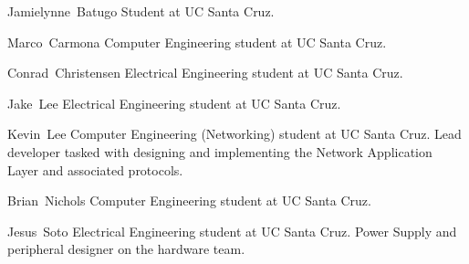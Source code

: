 \documentclass[journal,compsoc]{IEEEtran}
\begin{document}
\begin{IEEEbiography}{Jamielynne~Batugo}
  Student at UC Santa Cruz.
\end{IEEEbiography}

\begin{IEEEbiography}{Marco~Carmona}
  Computer Engineering student at UC Santa Cruz.
\end{IEEEbiography}

\begin{IEEEbiography}
{Conrad~Christensen}
  Electrical Engineering student at UC Santa Cruz.
\end{IEEEbiography}

\begin{IEEEbiography}{Jake~Lee}
  Electrical Engineering student at UC Santa Cruz.
\end{IEEEbiography}

\begin{IEEEbiography}
{Kevin~Lee}
  Computer Engineering (Networking) student at UC Santa Cruz. Lead developer tasked with designing and implementing the Network Application Layer and associated protocols.
\end{IEEEbiography}

\begin{IEEEbiography}{Brian~Nichols}
  Computer Engineering student at UC Santa Cruz.
\end{IEEEbiography}

\begin{IEEEbiography}{Jesus~Soto}
  Electrical Engineering student at UC Santa Cruz. Power Supply and peripheral designer on the hardware team. 
\end{IEEEbiography}
\end{document}
